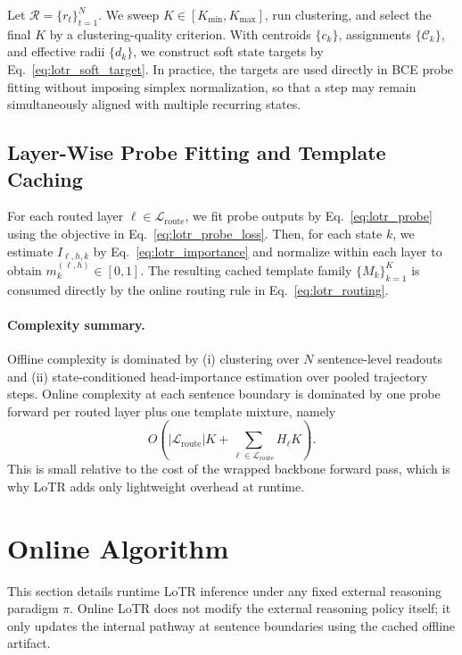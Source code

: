 Let \(\mathcal{R}=\{r_t\}_{t=1}^N\). We sweep \(K\in[K_{\min},K_{\max}]\), run clustering, and select the final \(K\) by a clustering-quality criterion. With centroids \(\{c_k\}\), assignments \(\{\mathcal{C}_k\}\), and effective radii \(\{d_k\}\), we construct soft state targets by Eq.~\eqref{eq:lotr_soft_target}. In practice, the targets are used directly in BCE probe fitting without imposing simplex normalization, so that a step may remain simultaneously aligned with multiple recurring states.

\subsection{Layer-Wise Probe Fitting and Template Caching}
\label{app:alg_offline_probe_template}

For each routed layer \(\ell\in\mathcal{L}_{\mathrm{route}}\), we fit probe outputs by Eq.~\eqref{eq:lotr_probe} using the objective in Eq.~\eqref{eq:lotr_probe_loss}. Then, for each state \(k\), we estimate \(I_{\ell,h,k}\) by Eq.~\eqref{eq:lotr_importance} and normalize within each layer to obtain \(m_k^{(\ell,h)}\in[0,1]\). The resulting cached template family \(\{M_k\}_{k=1}^K\) is consumed directly by the online routing rule in Eq.~\eqref{eq:lotr_routing}.

\paragraph{Complexity summary.}
Offline complexity is dominated by (i) clustering over \(N\) sentence-level readouts and (ii) state-conditioned head-importance estimation over pooled trajectory steps. Online complexity at each sentence boundary is dominated by one probe forward per routed layer plus one template mixture, namely
\begin{equation}
O\!\left(|\mathcal{L}_{\mathrm{route}}|K+\sum_{\ell\in\mathcal{L}_{\mathrm{route}}} H_\ell K\right).
\end{equation}
This is small relative to the cost of the wrapped backbone forward pass, which is why LoTR adds only lightweight overhead at runtime.

\section{Online Algorithm}
\label{app:alg_online}

This section details runtime LoTR inference under any fixed external reasoning paradigm \(\pi\). Online LoTR does not modify the external reasoning policy itself; it only updates the internal pathway at sentence boundaries using the cached offline artifact.

